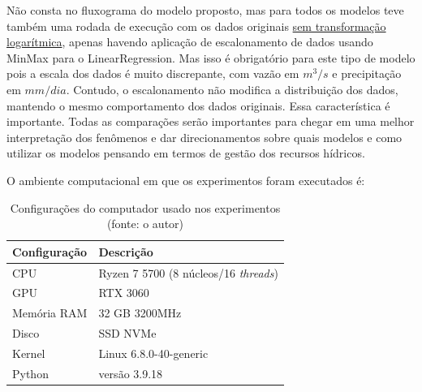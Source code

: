 Não consta no fluxograma do modelo proposto, mas para todos os modelos teve também uma rodada de execução com os dados originais \underline{sem transformação logarítmica}, apenas havendo aplicação de escalonamento de dados usando MinMax para o LinearRegression. Mas isso é obrigatório para este tipo de modelo pois a escala dos dados é muito discrepante, com vazão em $m^3/s$ e precipitação em $mm/dia$. Contudo, o escalonamento não modifica a distribuição dos dados, mantendo o mesmo comportamento dos dados originais. Essa característica é importante. Todas as comparações serão importantes para chegar em uma melhor interpretação dos fenômenos e dar direcionamentos sobre quais modelos e como utilizar os modelos pensando em termos de gestão dos recursos hídricos.



O ambiente computacional em que os experimentos foram executados é:

\begin{table}[!h]
	\centering \small
	\caption{Configurações do computador usado nos experimentos\\(fonte: o autor)}
	\begin{tabular}{|l|l|} \hline 
		\textbf{Configuração} & \textbf{Descrição} \\\hline
		CPU                   & Ryzen 7 5700 (8 núcleos/16 \textit{threads}) \\\hline
		GPU                   & RTX 3060                                     \\\hline
		Memória RAM           & 32 GB 3200MHz                                \\\hline
		Disco                 & SSD NVMe                                     \\\hline
		Kernel                & Linux 6.8.0-40-generic                       \\\hline
		Python                & versão 3.9.18                                \\\hline
	\end{tabular}
	\label{tab:config_pc}
\end{table}

